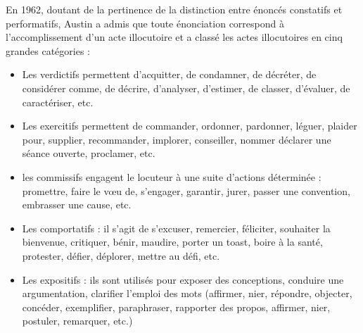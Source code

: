 En 1962, doutant de la pertinence de la distinction entre énoncés constatifs et performatifs, Austin a admis que toute énonciation correspond à l’accomplissement d’un acte illocutoire et a classé les actes illocutoires en cinq grandes catégories :
\begin{itemize}
\item Les verdictifs permettent d’acquitter, de condamner, de décréter, de considérer comme, de décrire, d’analyser, d’estimer, de classer, d’évaluer, de caractériser, etc.
\item Les exercitifs permettent de commander, ordonner, pardonner, léguer, plaider pour, supplier, recommander, implorer, conseiller, nommer déclarer une séance ouverte, proclamer, etc.
\item les commissifs engagent le locuteur à une suite d’actions déterminée : promettre, faire le vœu de, s’engager, garantir, jurer, passer une convention, embrasser une cause, etc.
\item Les comportatifs : il s’agit de s’excuser, remercier, féliciter, souhaiter la bienvenue, critiquer, bénir, maudire, porter un toast, boire à la santé, protester, défier, déplorer, mettre au défi, etc.
\item Les expositifs : ils sont utilisés pour exposer des conceptions, conduire une argumentation, clarifier l’emploi des mots (affirmer, nier, répondre, objecter, concéder, exemplifier, paraphraser, rapporter des propos, affirmer, nier, postuler, remarquer, etc.)
\end{itemize}

